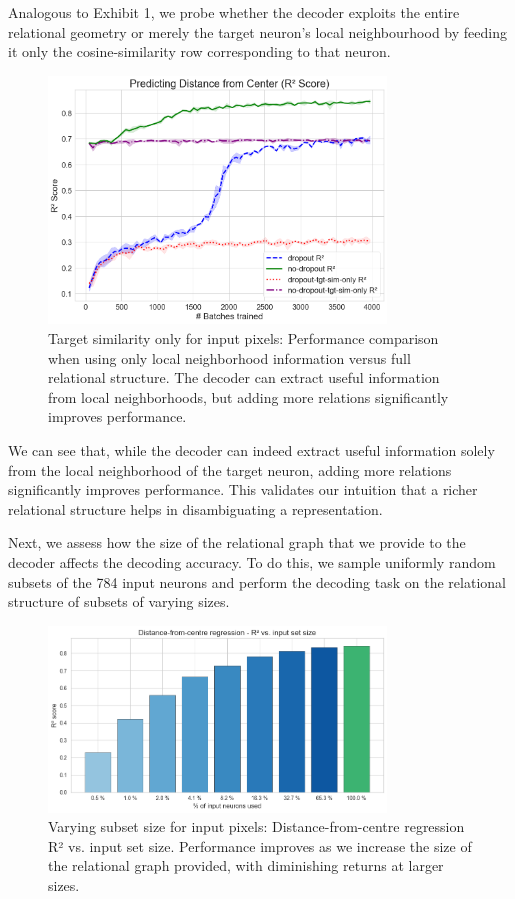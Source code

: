 \documentclass[11pt]{article}
\begin{document}
Analogous to Exhibit 1, we probe whether the decoder exploits the entire relational geometry or merely the target neuron's local neighbourhood by feeding it only the cosine-similarity row corresponding to that neuron.

\begin{figure}[htbp]
\centering
\includegraphics[width=0.8\textwidth]{figures/target-similarity-only-input-pixels.png}
\caption{Target similarity only for input pixels: Performance comparison when using only local neighborhood information versus full relational structure. The decoder can extract useful information from local neighborhoods, but adding more relations significantly improves performance.}
\label{fig:target-similarity-input}
\end{figure}

We can see that, while the decoder can indeed extract useful information solely from the local neighborhood of the target neuron, adding more relations significantly improves performance. This validates our intuition that a richer relational structure helps in disambiguating a representation.

Next, we assess how the size of the relational graph that we provide to the decoder affects the decoding accuracy. To do this, we sample uniformly random subsets of the 784 input neurons and perform the decoding task on the relational structure of subsets of varying sizes.

\begin{figure}[htbp]
\centering
\includegraphics[width=0.8\textwidth]{figures/varying-subset-size-input-pixels.png}
\caption{Varying subset size for input pixels: Distance-from-centre regression R² vs. input set size. Performance improves as we increase the size of the relational graph provided, with diminishing returns at larger sizes.}
\label{fig:varying-subset}
\end{figure}
\end{document}
